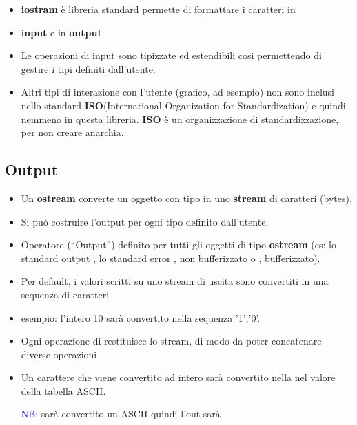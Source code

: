 \begin{itemize}
    \item \textbf{iostram} è libreria standard permette di formattare i caratteri in 
    \item \textbf{input} e in \textbf{output}.
    \item Le operazioni di input sono tipizzate ed estendibili cosi permettendo di gestire i tipi definiti dall'utente.
    \item Altri tipi di interazione con l’utente (grafico, ad esempio)
    non sono inclusi nello standard \textbf{ISO}(International Organization for Standardization) e quindi nemmeno in  questa libreria. \textbf{ISO} è un organizzazione di standardizzazione, per non creare anarchia.
\end{itemize}
\subsection{Output}
\begin{itemize}
    \item  Un \textbf{ostream} converte un oggetto con tipo in uno \textbf{stream} di
    caratteri (bytes).
    \item  Si può costruire l’output per ogni tipo definito dall’utente.
    \item  Operatore \textcolor{blue}{\code{<<}} (“Output”) definito per tutti gli oggetti di tipo \textbf{ostream} (es: lo standard output , lo standard error
    , non bufferizzato o , bufferizzato).
    \item  Per default, i valori scritti su uno stream di uscita sono
    convertiti in una sequenza di caratteri
    \item  esempio: l’intero 10 sarà convertito nella sequenza ’1’,’0’.
    \item  Ogni operazione di \textcolor{blue}{\code{<<}} restituisce lo stream, di modo da
    poter concatenare diverse operazioni
    
    \item Un carattere che viene convertito ad intero sarà convertito nella nel valore della tabella ASCII.
    \begin{tcolorbox}[width=15cm, boxsep=10pt]
        
        \textcolor{blue}{NB:}  sarà convertito un ASCII quindi l'out sarà \textcolor{blue}{}
    \end{tcolorbox}
\end{itemize}
